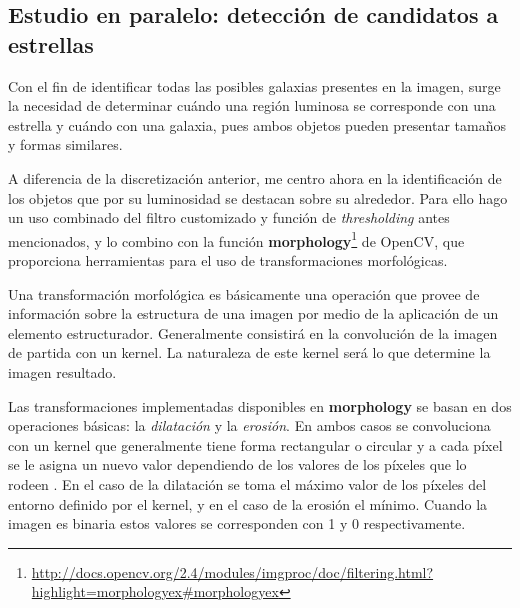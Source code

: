 \documentclass[a4paper,12pt]{article}
\begin{document}
\subsection{Estudio en paralelo: detección de candidatos a estrellas}
Con el fin de identificar todas las posibles galaxias presentes en la imagen, surge la necesidad de determinar cuándo una región luminosa se corresponde con una estrella y cuándo con una galaxia, pues ambos objetos pueden presentar tamaños y formas similares.

A diferencia de la discretización anterior, me centro ahora en la identificación de los objetos que por su luminosidad se destacan sobre su alrededor. Para ello hago un uso combinado del filtro customizado y función de \textit{thresholding} antes mencionados, y lo combino con la función \textbf{morphology}\footnote{\url{http://docs.opencv.org/2.4/modules/imgproc/doc/filtering.html?highlight=morphologyex#morphologyex}} de OpenCV, que proporciona herramientas para el uso de transformaciones morfológicas.

Una transformación morfológica es básicamente una operación que provee de información sobre la estructura de una imagen por medio de la aplicación de un elemento estructurador. Generalmente consistirá en la convolución de la imagen de partida con un kernel. La naturaleza de este kernel será lo que determine la imagen resultado.

Las transformaciones implementadas disponibles en \textbf{morphology} se basan en dos operaciones básicas: la \textit{dilatación} y la \textit{erosión}. En ambos casos se convoluciona con un kernel que generalmente tiene forma rectangular o circular y a cada píxel se le asigna un nuevo valor dependiendo de los valores de los píxeles que lo rodeen . En el caso de la dilatación se toma el máximo valor de los píxeles del entorno definido por el kernel, y en el caso de la erosión el mínimo. Cuando la imagen es binaria estos valores se corresponden con 1 y 0 respectivamente.
\end{document}
